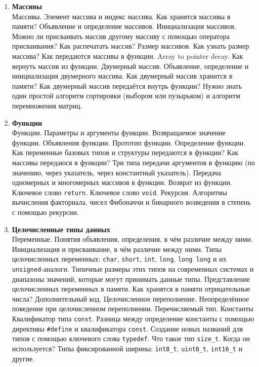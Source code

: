 \documentclass{article}
\begin{document}
\begin{enumerate}
\item \textbf{Массивы}\\
Массивы. Элемент массива и индекс массива. Как хранятся массивы в памяти? Объявление и определение массивов. Инициализация массивов. Можно ли присваивать массив другому массиву с помощью оператора присваивания? Как распечатать массив? Размер массивов. Как узнать размер массива? Как передаются массивы в функции. Array to pointer decay. Как вернуть массив из функции. Двумерный массив. Объявление, определение и инициализация двумерного массива. Как двумерный массив хранится в памяти? Как двумерный массив передаётся внутрь функции? Нужно знать один простой алгоритм сортировки (выбором или пузырьком) и алгоритм перемножения матриц. 

\item \textbf{Функции}\\
Функции. Параметры и аргументы функции. Возвращаемое значение функции. Объявления функции. Прототип функции. Определение функции. Как переменные базовых типов и структуры передаются в функции? Как массивы передаюся в функции? Три типа передачи аргументов в функцию (по значению, через указатель, через константный указатель). Передача одномерных и многомерных массивов в функции. Возврат из функции. Ключевое слово \texttt{return}. Ключевое слово \texttt{void}. Рекурсия. Алгоритмы вычисления факториала, чисел Фибоначчи и бинарного возведения в степень с помощью рекурсии. 

\item \textbf{Целочисленные типы данных}\\
Переменные. Понятия объявления, определения, в чём различие между ними. Инициализация и присваивание, в чём различие между ними. Типы целочисленных переменных: \texttt{char}, \texttt{short}, \texttt{int}, \texttt{long}, \texttt{long long} и их \texttt{unsigned}-аналоги. Типичные размеры этих типов на современных системах и диапазоны значений, которые могут принимать данные типы. Представление целочисленных переменных в памяти. Как хранятся в памяти отрицательные числа? Дополнительный код.  Целочисленное переполнение. Неопределённое поведение при целочисленном переполнении. Перечисляемый тип. Константы Квалификатор типа \texttt{const}. Разница между определение константы с помощью директивы \texttt{\#define} и квалификатора \texttt{const}.  Создание новых названий для типов с помощью ключевого слова \texttt{typedef}. Что такое тип \texttt{size\_t}. Когда он используется? Типы фиксированной ширины: \texttt{int8\_t}, \texttt{uint8\_t}, \texttt{int16\_t} и другие.



\end{enumerate}
\end{document}
